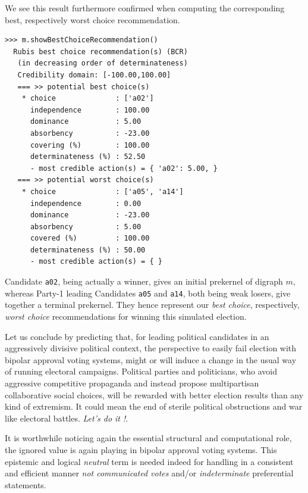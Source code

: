 We see this result furthermore confirmed when computing the corresponding best, respectively worst choice recommendation.    
\begin{lstlisting}
>>> m.showBestChoiceRecommendation()
  Rubis best choice recommendation(s) (BCR)
   (in decreasing order of determinateness)   
   Credibility domain: [-100.00,100.00]
   === >> potential best choice(s)
    * choice              : ['a02']
      independence        : 100.00
      dominance           : 5.00
      absorbency          : -23.00
      covering (%)        : 100.00
      determinateness (%) : 52.50
      - most credible action(s) = { 'a02': 5.00, }
   === >> potential worst choice(s) 
    * choice              : ['a05', 'a14']
      independence        : 0.00
      dominance           : -23.00
      absorbency          : 5.00
      covered (%)         : 100.00
      determinateness (%) : 50.00
      - most credible action(s) = { }
\end{lstlisting}
Candidate \texttt{a02}, being actually a \Condorcet winner, gives an initial prekernel of digraph $m$, whereas Party-1 leading Candidates \texttt{a05} and \texttt{a14}, both being weak \Condorcet losers, give together a terminal prekernel. They hence represent our \emph{best choice}, respectively, \emph{worst choice} recommendations for winning this simulated election.

Let us conclude by predicting that, for leading political candidates in an aggressively divisive political context, the perspective to easily fail election with bipolar approval voting systems, might or will induce a change in the usual way of running electoral campaigns. Political parties and politicians, who avoid aggressive competitive propaganda and instead propose multipartisan collaborative social choices, will be rewarded with better election results than any kind of extremism. It could mean the end of sterile political obstructions and war like electoral battles. \emph{Let's do it !}.

It is worthwhile noticing again the essential structural and computational role, the ignored value is again playing in bipolar approval voting systems. This epistemic and logical \emph{neutral} term is needed indeed for handling in a consistent and efficient manner \emph{not communicated votes} and/or \emph{indeterminate} preferential statements.
 
\clearpage


